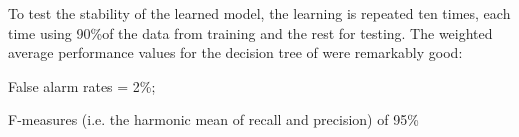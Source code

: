       To test the stability of the learned model, the learning is repeated ten times, each time using 90\%of the data from training and the rest
      for testing. The weighted average performance values for the decision tree of  were remarkably good:
      \bi
    \item False alarm rates = 2\%;
    \item F-measures (i.e. the harmonic mean of recall and precision) of 95\%
      \ei

      
      
